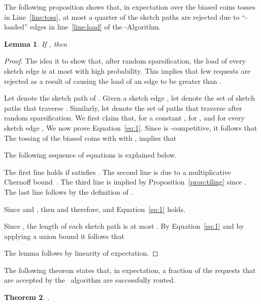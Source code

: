 \documentclass[11pt]{article}
\newtheorem{theorem}{Theorem}
\newtheorem{lemma}[theorem]{Lemma}
\newcommand{\route}{\text{\sc{ipp}}}
\newenvironment{proof sketch}[1]{\noindent {\emph{Proof sketch of #1:}}}{\hfill \qed}
\begin{document}
The following proposition shows that, in expectation  over the biased coins
tosses in Line~\ref{line:toss}, at most a quarter of the sketch paths are
rejected due to ``-loaded''  edges in line~\ref{line:load} of the
-Algorithm.
\begin{lemma}\label{lemma:Rinj}
If , then

\end{lemma}

\begin{proof}
The idea it to show that, after random sparsification, the load of every sketch edge is at
most  with high probability. This implies that few requests are rejected
as a result of causing the load of an edge to be greater than .

Let  denote the sketch path of .  Given a sketch edge , let  denote the set of sketch
paths that traverse .  Similarly, let  denote the set of paths that traverse  after random
sparsification.  We first claim that, for a constant , for , and
for every sketch edge , 
We now prove Equation~\eqref{eq:1}.  Since  is -competitive, it follows
that  The tossing of the biased coins with  with , implies that


\noindent
The following sequence of equations is explained below.
    
    The first line holds if  satisfies .
The second line is due to a multiplicative Chernoff bound~\cite{MU}.
The third line is implied by Proposition~\ref{prop:tiling} since
    .
The last line follows by the definition of .

Since  and , then  and therefore,  and Equation~\eqref{eq:1}
    holds.


Since , the length of each sketch path is at most .  By
    Equation~\eqref{eq:1} and by applying a union bound it follows that

The lemma follows by linearity of expectation.
\end{proof}

The following theorem states that, in expectation, a  fraction
of the requests that are accepted by the \route\ algorithm are successfully routed.
\begin{theorem}\label{theorem:Rinjt}
  .
\end{theorem}
\end{document}
